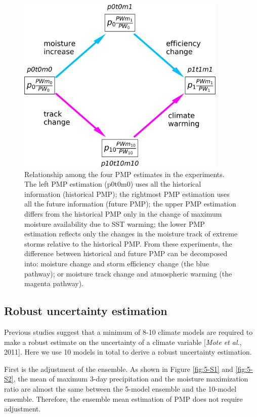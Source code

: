 \begin{figure}[htbp]
	\centering
	\includegraphics[width=10cm]{pics/ch5/fig3.jpg}
	\caption{Relationship among the four PMP estimates in the experiments. The left PMP estimation (p0t0m0) uses all the historical information (historical PMP); the rightmost PMP estimation uses all the future information (future PMP); the upper PMP estimation differs from the historical PMP only in the change of maximum moisture availability due to SST warming; the lower PMP estimation reflects only the changes in the moisture track of extreme storms relative to the historical PMP. From these experiments, the difference between historical and future PMP can be decomposed into: moisture change and storm efficiency change (the blue pathway); or moisture track change and atmospheric warming (the magenta pathway).}
	\label{fig:5-3}
\end{figure}

\subsection{Robust uncertainty estimation}

Previous studies suggest that a minimum of 8-10 climate models are required to make a robust estimate on the uncertainty of a climate variable [\textit{Mote et al.}, 2011]. Here we use 10 models in total to derive a robust uncertainty estimation.

First is the adjustment of the ensemble. As shown in Figure \ref{fig:5-S1} and \ref{fig:5-S2}, the mean of maximum 3-day precipitation and the moisture maximization ratio are almost the same between the 5-model ensemble and the 10-model ensemble. Therefore, the ensemble mean estimation of PMP does not require adjustment.

